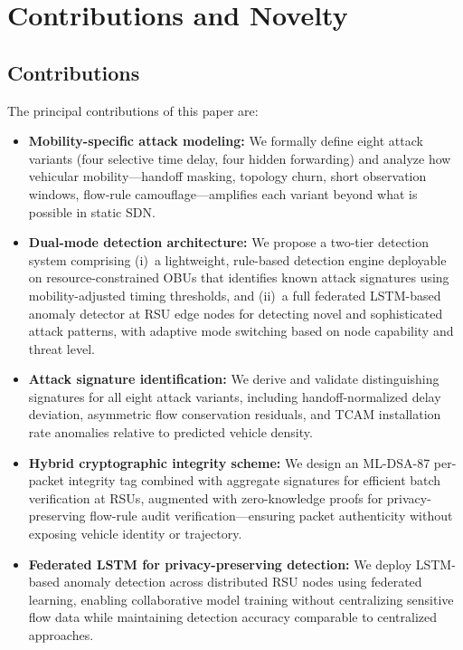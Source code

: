 \documentclass[12pt, a4paper]{report}
\begin{document}
\section{Contributions and Novelty}


\subsection{Contributions}
\label{sec:contributions}

The principal contributions of this paper are:
\begin{itemize}
    \item \textbf{Mobility-specific attack modeling:} We formally define 
    eight attack variants (four selective time delay, four hidden 
    forwarding) and analyze how vehicular mobility---handoff masking, 
    topology churn, short observation windows, flow-rule 
    camouflage---amplifies each variant beyond what is possible in 
    static SDN.
    
    \item \textbf{Dual-mode detection architecture:} We propose a 
    two-tier detection system comprising (i)~a lightweight, rule-based 
    detection engine deployable on resource-constrained OBUs that 
    identifies known attack signatures using mobility-adjusted timing 
    thresholds, and (ii)~a full federated LSTM-based anomaly detector 
    at RSU edge nodes for detecting novel and sophisticated attack 
    patterns, with adaptive mode switching based on node capability 
    and threat level.
    
    \item \textbf{Attack signature identification:} We derive and 
    validate distinguishing signatures for all eight attack variants, 
    including handoff-normalized delay deviation, asymmetric flow 
    conservation residuals, and TCAM installation rate anomalies 
    relative to predicted vehicle density.
    
    \item \textbf{Hybrid cryptographic integrity scheme:} We design 
    an ML-DSA-87 per-packet integrity tag combined with aggregate 
    signatures for efficient batch verification at RSUs, augmented 
    with zero-knowledge proofs for privacy-preserving flow-rule 
    audit verification---ensuring packet authenticity without 
    exposing vehicle identity or trajectory.
    
    \item \textbf{Federated LSTM for privacy-preserving detection:} 
    We deploy LSTM-based anomaly detection across distributed RSU 
    nodes using federated learning, enabling collaborative model 
    training without centralizing sensitive flow data while 
    maintaining detection accuracy comparable to centralized 
    approaches.
    

\end{itemize}
\end{document}
